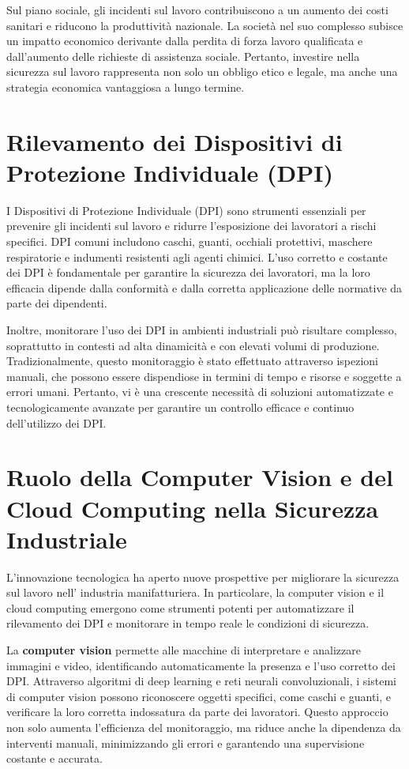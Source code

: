 Sul piano sociale, gli incidenti sul lavoro contribuiscono a un aumento dei costi sanitari e riducono la produttività nazionale. La società nel suo complesso subisce un impatto economico derivante dalla perdita di forza lavoro qualificata e dall'aumento delle richieste di assistenza sociale. Pertanto, investire nella sicurezza sul lavoro rappresenta non solo un obbligo etico e legale, ma anche una strategia economica vantaggiosa a lungo termine.

\section{Rilevamento dei Dispositivi di Protezione Individuale (DPI)}

I Dispositivi di Protezione Individuale (DPI) sono strumenti essenziali per prevenire gli incidenti sul lavoro e ridurre l'esposizione dei lavoratori a rischi specifici. DPI comuni includono caschi, guanti, occhiali protettivi, maschere respiratorie e indumenti resistenti agli agenti chimici. L'uso corretto e costante dei DPI è fondamentale per garantire la sicurezza dei lavoratori, ma la loro efficacia dipende dalla conformità e dalla corretta applicazione delle normative da parte dei dipendenti.

Inoltre, monitorare l'uso dei DPI in ambienti industriali può risultare complesso, soprattutto in contesti ad alta dinamicità e con elevati volumi di produzione. Tradizionalmente, questo monitoraggio è stato effettuato attraverso ispezioni manuali, che possono essere dispendiose in termini di tempo e risorse e soggette a errori umani. Pertanto, vi è una crescente necessità di soluzioni automatizzate e tecnologicamente avanzate per garantire un controllo efficace e continuo dell'utilizzo dei DPI.

\section{Ruolo della Computer Vision e del Cloud Computing nella Sicurezza Industriale}

L'innovazione tecnologica ha aperto nuove prospettive per migliorare la sicurezza sul lavoro nell' industria manifatturiera. In particolare, la computer vision e il cloud computing emergono come strumenti potenti per automatizzare il rilevamento dei DPI e monitorare in tempo reale le condizioni di sicurezza.

La {\bfseries computer vision} permette alle macchine di interpretare e analizzare immagini e video, identificando automaticamente la presenza e l'uso corretto dei DPI. Attraverso algoritmi di deep learning e reti neurali convoluzionali, i sistemi di computer vision possono riconoscere oggetti specifici, come caschi e guanti, e verificare la loro corretta indossatura da parte dei lavoratori. Questo approccio non solo aumenta l'efficienza del monitoraggio, ma riduce anche la dipendenza da interventi manuali, minimizzando gli errori e garantendo una supervisione costante e accurata.

